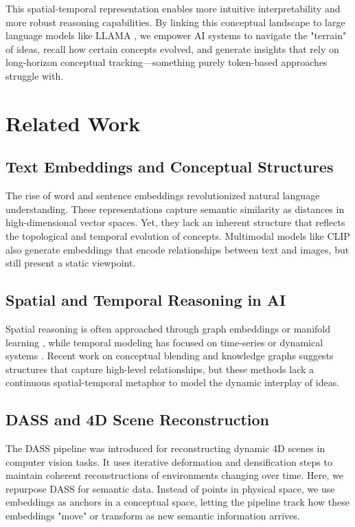 \documentclass{article}
\begin{document}
This spatial-temporal representation enables more intuitive interpretability and more robust reasoning capabilities. By linking this conceptual landscape to large language models like LLAMA \cite{touvron2023llama}, we empower AI systems to navigate the "terrain" of ideas, recall how certain concepts evolved, and generate insights that rely on long-horizon conceptual tracking—something purely token-based approaches struggle with.

\section{Related Work}
\subsection{Text Embeddings and Conceptual Structures}
The rise of word and sentence embeddings \cite{mikolov2013distributed, pennington2014glove, devlin2018bert} revolutionized natural language understanding. These representations capture semantic similarity as distances in high-dimensional vector spaces. Yet, they lack an inherent structure that reflects the topological and temporal evolution of concepts. Multimodal models like CLIP \cite{radford2021learning} also generate embeddings that encode relationships between text and images, but still present a static viewpoint.

\subsection{Spatial and Temporal Reasoning in AI}
Spatial reasoning is often approached through graph embeddings \cite{nickel2017poincare} or manifold learning \cite{tenenbaum2000global}, while temporal modeling has focused on time-series or dynamical systems \cite{chen2018neural}. Recent work on conceptual blending \cite{veale2013complex} and knowledge graphs \cite{wang2017knowledge} suggests structures that capture high-level relationships, but these methods lack a continuous spatial-temporal metaphor to model the dynamic interplay of ideas.

\subsection{DASS and 4D Scene Reconstruction}
The DASS pipeline \cite{li2023dass} was introduced for reconstructing dynamic 4D scenes in computer vision tasks. It uses iterative deformation and densification steps to maintain coherent reconstructions of environments changing over time. Here, we repurpose DASS for semantic data. Instead of points in physical space, we use embeddings as anchors in a conceptual space, letting the pipeline track how these embeddings "move" or transform as new semantic information arrives.
\end{document}
